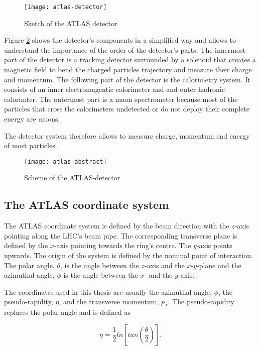 \begin{figure}[h]
  \centering
  \texttt{[image: atlas-detector]}
  \caption[Sketch of the ATLAS detector]{Sketch of the ATLAS detector \cite{atlasfigures}}
  \label{fig:atlas}
\end{figure}

Figure \ref{fig:atlas_sketch} shows the detector's components in a simplified way and allows to understand the importance of the order of the detector's parts. The innermost part of the detector is a tracking detector surrounded by a solenoid that creates a magnetic field to bend the charged particles trajectory and measure their charge and momentum.
The following part of the detector is the calorimetry system. It consists of an inner electromagentic calorimeter and and outer hadronic calorimter. The outermost part is a muon spectrometer because most of the particles that cross the calorimeters undetected or do not deploy their complete energy are muons.

The detector system therefore allows to measure charge, momentum end energy of most particles.


\begin{figure}[h]
  \centering
  \texttt{[image: atlas-abstract]}
  \caption[Sketch of the transversal section of the ATLAS detector]{Scheme of the ATLAS-detector \cite{atlasfigures}}
  \label{fig:atlas_sketch}
\end{figure}

\subsection{The ATLAS coordinate system}

The ATLAS coordinate system is defined by the beam direction with the $z$-axis pointing along the LHC's beam pipe. The corresponding transverse plane is defined by the $x$-axis pointing towards the ring's centre. The $y$-axis points upwards. The origin of the system is defined by the nominal point of interaction. The polar angle, $\theta$, is the angle between the $z$-axis and the $x$-$y$-plane and the azimuthal angle, $\phi$ is the angle between the $x$- and the $y$-axis.

The coordinates used in this thesis are usually the azimuthal angle, $\phi$, the pseudo-rapidity, $\eta$, and the transverse momentum, $p_T$. The pseudo-rapidity replaces the polar angle and is defined as

\begin{equation}
\eta = \frac{1}{2} ln\left[ tan\left(\frac{\theta}{2}\right)\right].
\end{equation}


